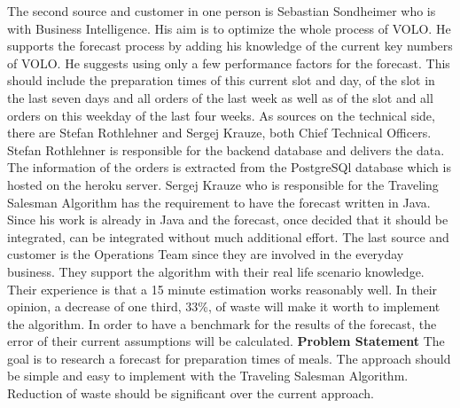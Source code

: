 The second source and customer in one person is Sebastian Sondheimer who is with Business Intelligence. His aim is to optimize the whole process of VOLO. He supports the forecast process by adding his knowledge of the current key numbers of VOLO. He suggests using only a few performance factors for the forecast. This should include the preparation times of this current slot and day, of the slot in the last seven days and all orders of the last week as well as of the slot and all orders on this weekday of the last four weeks.\newline
As sources on the technical side, there are Stefan Rothlehner and Sergej Krauze, both Chief Technical Officers. Stefan Rothlehner is responsible for the backend database and delivers the data. The information of the orders is extracted from the PostgreSQl database which is hosted on the heroku server. Sergej Krauze who is responsible for the Traveling Salesman Algorithm has the requirement to have the forecast written in Java. Since his work is already in Java and the forecast, once decided that it should be integrated, can be integrated without much additional effort.\newline
The last source and customer is the Operations Team since they are involved in the everyday business. They support the algorithm with their real life scenario knowledge. Their experience is that a 15 minute estimation works reasonably well. In their opinion, a decrease of one third, 33\%, of waste will make it worth to implement the algorithm. In order to have a benchmark for the results of the forecast, the error of their current assumptions will be calculated.
\newline\newline\textbf{Problem Statement}\newline
The goal is to research a forecast for preparation times of meals. The approach should be simple and easy to implement with the Traveling Salesman Algorithm. Reduction of waste should be significant over the current approach.
